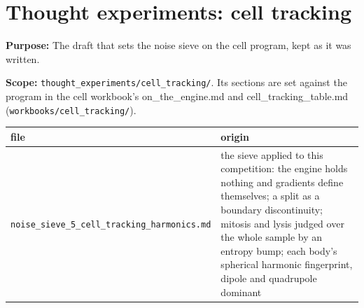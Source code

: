 \chapter{\texorpdfstring{Thought experiments: cell tracking}{Thought experiments: cell tracking}}
\label{chap:readme}

\textbf{Purpose:} The draft that sets the noise sieve on the cell program, kept as it was written.

\textbf{Scope:} \texttt{thought\_\allowbreak{}experiments/\allowbreak{}cell\_\allowbreak{}tracking/\allowbreak{}}. Its sections are set against the program in the cell workbook's on\_\allowbreak{}the\_\allowbreak{}engine.md and cell\_\allowbreak{}tracking\_\allowbreak{}table.md (\texttt{workbooks/\allowbreak{}cell\_\allowbreak{}tracking/\allowbreak{}}).

{\small
\setlength{\tabcolsep}{6pt}
\begin{longtable}{>{\RaggedRight\arraybackslash}p{}>{\RaggedRight\arraybackslash}p{}}
\toprule
file & origin \\
\midrule
\endhead
\texttt{noise\_\allowbreak{}sieve\_\allowbreak{}5\_\allowbreak{}cell\_\allowbreak{}tracking\_\allowbreak{}harmonics.\allowbreak{}md} & the sieve applied to this competition: the engine holds nothing and gradients define themselves; a split as a boundary discontinuity; mitosis and lysis judged over the whole sample by an entropy bump; each body's spherical harmonic fingerprint, dipole and quadrupole dominant \\
\bottomrule
\end{longtable}
}
